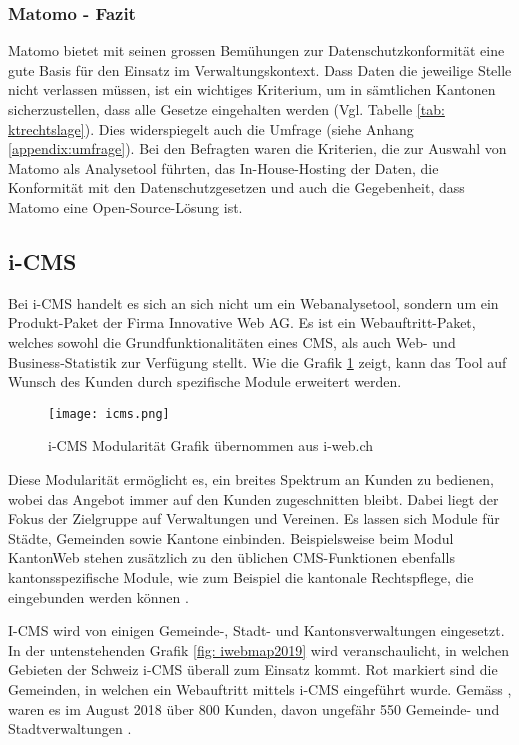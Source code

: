 \subsubsection{Matomo - Fazit}

Matomo bietet mit seinen grossen Bemühungen zur Datenschutzkonformität eine gute Basis für den Einsatz im Verwaltungskontext. Dass Daten die jeweilige Stelle nicht verlassen müssen, ist ein wichtiges Kriterium, um in sämtlichen Kantonen sicherzustellen, dass alle Gesetze eingehalten werden (Vgl. Tabelle \ref{tab: ktrechtslage}). Dies widerspiegelt auch die Umfrage (siehe Anhang \ref{appendix:umfrage}). Bei den Befragten waren die Kriterien, die zur Auswahl von Matomo als Analysetool führten, das In-House-Hosting der Daten, die Konformität mit den Datenschutzgesetzen und auch die Gegebenheit, dass Matomo eine Open-Source-Lösung ist.  

\newpage

\subsection{i-CMS} \label{subsec:icmsmarkt}
Bei i-CMS handelt es sich an sich nicht um ein Webanalysetool, sondern um ein Produkt-Paket der Firma Innovative Web AG. Es ist ein Webauftritt-Paket, welches sowohl die Grundfunktionalitäten eines CMS, als auch Web- und Business-Statistik zur Verfügung stellt\parencite{iwebwebsiteCMS}. Wie die Grafik \ref{fig: icms} zeigt, kann das Tool auf Wunsch des Kunden durch spezifische Module erweitert werden.


\begin{figure}[h]
  \centering
  \texttt{[image: icms.png]}
  \caption{i-CMS Modularität Grafik übernommen aus i-web.ch \parencite{iweb2019revue}}
  \label{fig: icms}
\end{figure}

Diese Modularität ermöglicht es, ein breites Spektrum an Kunden zu bedienen, wobei das Angebot immer auf den Kunden zugeschnitten bleibt. Dabei liegt der Fokus der Zielgruppe auf Verwaltungen und Vereinen. Es lassen sich Module für Städte, Gemeinden sowie Kantone einbinden. Beispielsweise beim Modul KantonWeb stehen zusätzlich zu den üblichen CMS-Funktionen ebenfalls kantonsspezifische Module, wie zum Beispiel die kantonale Rechtspflege, die eingebunden werden können \parencite{iwebwebsiteKanotonWeb}.

I-CMS wird von einigen Gemeinde-, Stadt- und Kantonsverwaltungen eingesetzt. In der untenstehenden Grafik \ref{fig: iwebmap2019} wird veranschaulicht, in welchen Gebieten der Schweiz i-CMS überall zum Einsatz kommt. Rot markiert sind die Gemeinden, in welchen ein Webauftritt mittels i-CMS eingeführt wurde. Gemäss \parencite[S. 14]{iweb2018revue}, waren es im August 2018 über 800 Kunden, davon ungefähr 550 Gemeinde- und Stadtverwaltungen \parencite{iwebwebsiteGemeindeWeb}.

